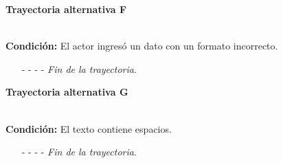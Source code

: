 \hypertarget{CU12-1-1-1-1:TAF}{\textbf{Trayectoria alternativa F}}\\
\noindent \textbf{Condición:} El actor ingresó un dato con un formato incorrecto.
\begin{enumerate}
	\UCpaso[\UCsist] Muestra el mensaje  señalando el campo que presenta el error en la pantalla .
	\UCpaso Regresa al paso \ref{CU12.1.1.1.1-P5} de la trayectoria principal.
	\item[- -] - - {\em {Fin de la trayectoria}}.
\end{enumerate}
\hypertarget{CU12-1-1-1-1:TAG}{\textbf{Trayectoria alternativa G}}\\
\noindent \textbf{Condición:} El texto contiene espacios.
\begin{enumerate}
	\UCpaso[\UCsist] Sustituye los espacios por guiones bajos.
	\UCpaso Continua en el \ref{CU12.1.1.1.1-TA1} de la trayectoria alternativa A.
	\item[- -] - - {\em {Fin de la trayectoria}}.
\end{enumerate}
